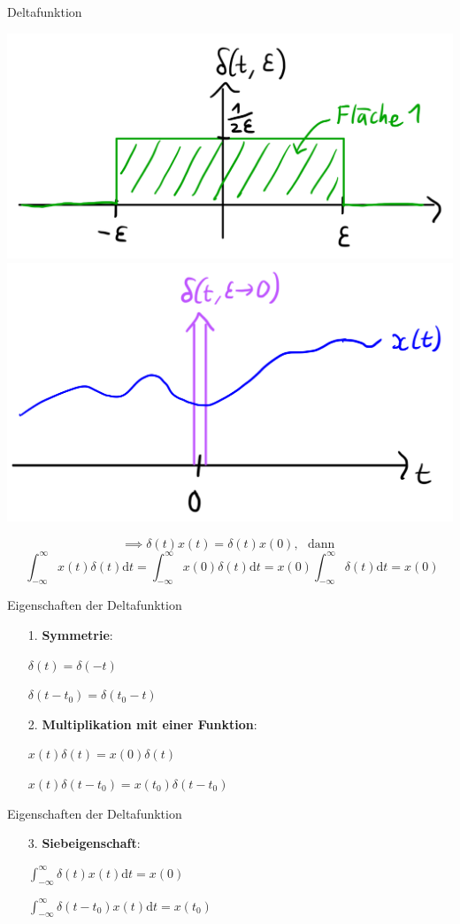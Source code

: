 \documentclass[14pt, aspectratio=169, handout]{beamer}
\begin{document}
\begin{frame}{Deltafunktion}
    \begin{center}
        \includegraphics[width=0.4\linewidth]{figures/Deltafunktion_1.jpg}
        \includegraphics[width=0.4\linewidth]{figures/Deltafunktion_2.jpg}
    \end{center}
    $$\implies \delta(t)x(t) = \delta(t)x(0), \hspace{4pt} \text{ dann } $$
    $$\hspace{4pt} \int_{-\infty}^{\infty} x(t)\delta(t) \text{d}t = \int_{-\infty}^{\infty} x(0)\delta(t) \text{d}t = x(0)\int_{-\infty}^{\infty}\delta(t) \text{d}t = x(0)$$
\end{frame}

\begin{frame}{Eigenschaften der Deltafunktion}
    \begin{itemize}
        \item[1.] \textbf{Symmetrie}: 
        \item[] $\delta(t) = \delta(-t)$
        \item[] $\delta(t-t_0) = \delta(t_0 - t)$
        \item[] 
        \item[2.] \textbf{Multiplikation mit einer Funktion}: \item[] $x(t)\delta(t) = x(0)\delta(t)$
        \item[] $x(t)\delta(t-t_0)=x(t_0)\delta(t-t_0)$
    \end{itemize}
\end{frame}

\begin{frame}{Eigenschaften der Deltafunktion}
    \begin{itemize}
        \item[3.] \textbf{Siebeigenschaft}: 
        \item[] $\displaystyle\int_{-\infty}^{\infty}\delta(t)x(t)\text{d}t = x(0)$
        \item[] $\displaystyle\int_{-\infty}^{\infty}\delta(t-t_0)x(t)\text{d}t = x(t_0)$
    \end{itemize}
\end{frame}
\end{document}
